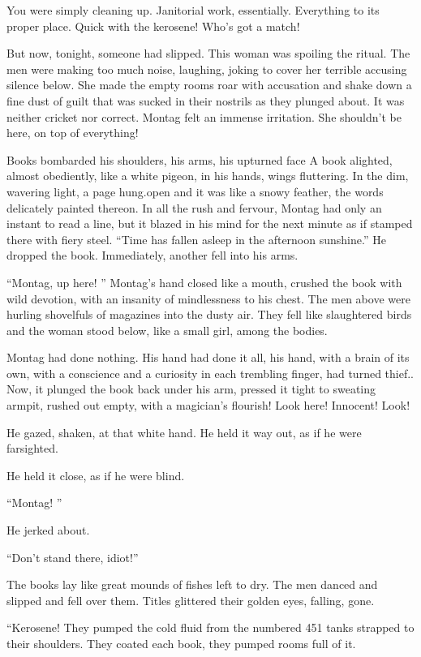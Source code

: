 \documentclass[11pt,openany]{book}
\begin{document}
You were simply cleaning up. Janitorial work, essentially. Everything to its proper place. Quick with the kerosene! Who's got a match!

But now, tonight, someone had slipped. This woman was spoiling the ritual. The men were making too much noise, laughing, joking to cover her terrible accusing silence below. She made the empty rooms roar with accusation and shake down a fine dust of guilt that was sucked in their nostrils as they plunged about. It was neither cricket nor correct. Montag felt an immense irritation. She shouldn't be here, on top of everything!

Books bombarded his shoulders, his arms, his upturned face A book alighted, almost obediently, like a white pigeon, in his hands, wings fluttering. In the dim, wavering light, a page hung.open and it was like a snowy feather, the words delicately painted thereon. In all the rush and fervour, Montag had only an instant to read a line, but it blazed in his mind for the next minute as if stamped there with fiery steel. ``Time has fallen asleep in the afternoon sunshine.'' He dropped the book. Immediately, another fell into his arms.

``Montag, up here! '' Montag's hand closed like a mouth, crushed the book with wild devotion, with an insanity of mindlessness to his chest. The men above were hurling shovelfuls of magazines into the dusty air. They fell like slaughtered birds and the woman stood below, like a small girl, among the bodies.

Montag had done nothing. His hand had done it all, his hand, with a brain of its own, with a conscience and a curiosity in each trembling finger, had turned thief.. Now, it plunged the book back under his arm, pressed it tight to sweating armpit, rushed out empty, with a magician's flourish! Look here! Innocent! Look!

He gazed, shaken, at that white hand. He held it way out, as if he were farsighted.

He held it close, as if he were blind.

``Montag! ''

He jerked about.

``Don't stand there, idiot!''

The books lay like great mounds of fishes left to dry. The men danced and slipped and fell over them. Titles glittered their golden eyes, falling, gone.

``Kerosene! They pumped the cold fluid from the numbered 451 tanks strapped to their shoulders. They coated each book, they pumped rooms full of it.
\end{document}
